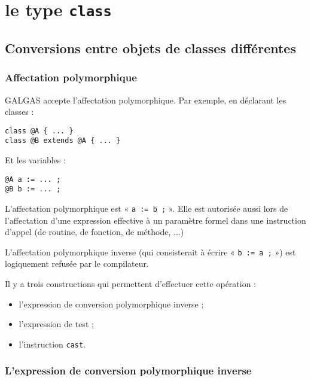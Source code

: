 
\chapter{le type \texttt{class}}

\section{Conversions entre objets de classes différentes}

\subsection{Affectation polymorphique}

GALGAS accepte l'affectation polymorphique. Par exemple, en déclarant les classes :

\begin{lstlisting}[language=galgas]
class @A { ... }
class @B extends @A { ... }
\end{lstlisting}
 
Et les variables :

\begin{lstlisting}[language=galgas]
@A a := ... ;
@B b := ... ;
\end{lstlisting}

L'affectation polymorphique est « \lstinline[language=galgas]{a := b ;} ». Elle est autorisée aussi lors de l'affectation d'une expression effective à un paramètre formel dans une instruction d'appel (de routine, de fonction, de méthode, ...)

L'affectation polymorphique inverse (qui consisterait à écrire « \lstinline[language=galgas]{b := a ;} ») est logiquement refusée par le compilateur.

Il y a trois constructions qui permettent d'effectuer cette opération :
\begin{itemize}
  \item l'expression de conversion polymorphique inverse ;
  \item l'expression de test ;
  \item l'instruction \lstinline[language=galgas]{cast}.
\end{itemize}

\subsection{L'expression de conversion polymorphique inverse}

